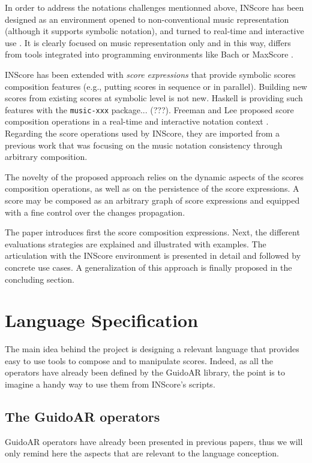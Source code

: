 \documentclass{article}
\newcommand{\sExpr}{\emph{score expressions} }
\begin{document}
In order to address the notations challenges mentionned above, INScore \cite{Fober:12a,fober14c} has been designed as an environment opened to non-conventional music representation (although it supports symbolic notation), and turned to real-time and interactive use \cite{Fober:13b, Fober:14b}. It is clearly focused on music representation only and in this way, differs from tools integrated into programming environments like Bach \cite{agostini12b} or MaxScore \cite{didko08}. 

INScore has been extended with \sExpr that provide symbolic scores composition features (e.g., putting scores in sequence or in parallel). Building new scores from existing scores at symbolic  level is not new. Haskell is providing such features with the \texttt{music-xxx} package... (???). Freeman and Lee proposed score composition operations in a real-time and interactive notation context \cite{Lee:2013}. Regarding the score operations used by INScore, they are imported from a previous work \cite{fober12b} that was focusing on the music notation consistency through arbitrary composition. 

The novelty of the proposed approach relies on the dynamic aspects of the scores composition operations, as well as on the persistence of the score expressions. A score may be composed as an arbitrary graph of score expressions and equipped with a fine control over the changes propagation.

The paper introduces first the score composition expressions. Next, the different evaluations strategies are explained and illustrated with examples. The articulation with the INScore environment is presented in detail and followed by concrete use cases. A generalization of this approach is finally proposed in the concluding section.  


\section{Language Specification}\label{language}

The main idea behind the project is designing a relevant language that provides easy to use tools to compose and to manipulate scores. Indeed, as all the operators have already been defined by the GuidoAR library, the point is to imagine a handy way to use them from INScore's scripts.

\subsection{The GuidoAR operators}
GuidoAR operators have already been presented in previous papers, thus we will only remind here the aspects that are relevant to the language conception.
\end{document}
